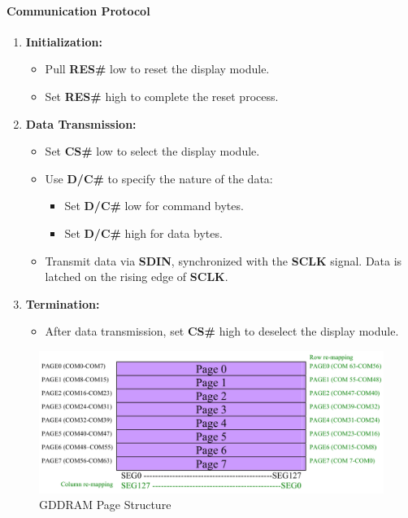 \hypertarget{communication-protocol}{%
\paragraph{Communication Protocol}\label{communication-protocol}}

\begin{enumerate}
\def\labelenumi{\arabic{enumi}.}
\tightlist
\item
  \textbf{Initialization:}

  \begin{itemize}
  \tightlist
  \item
    Pull \textbf{RES\#} low to reset the display module.
  \item
    Set \textbf{RES\#} high to complete the reset process.
  \end{itemize}
\item
  \textbf{Data Transmission:}

  \begin{itemize}
  \tightlist
  \item
    Set \textbf{CS\#} low to select the display module.
  \item
    Use \textbf{D/C\#} to specify the nature of the data:

    \begin{itemize}
    \tightlist
    \item
      Set \textbf{D/C\#} low for command bytes.
    \item
      Set \textbf{D/C\#} high for data bytes.
    \end{itemize}
  \item
    Transmit data via \textbf{SDIN}, synchronized with the \textbf{SCLK}
    signal. Data is latched on the rising edge of \textbf{SCLK}.
  \end{itemize}
\item
  \textbf{Termination:}

  \begin{itemize}
  \tightlist
  \item
    After data transmission, set \textbf{CS\#} high to deselect the
    display module.
  \end{itemize}
\end{enumerate}

\begin{figure}
\centering
\includegraphics{images/gddram_page_structure.png}
\caption{GDDRAM Page Structure}
\end{figure}

